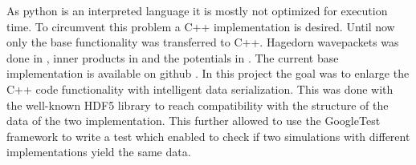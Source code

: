 As python is an interpreted language it is mostly not optimized for execution time. To circumvent this problem a C++ implementation is desired. Until now only the base functionality was transferred to C++. Hagedorn wavepackets was done in \cite{bt_michajab}, inner products in \cite{st_benedekv} and the potentials in \cite{bt_lionelm}. The current base implementation is available on github \cite{libwaveblocks}. In this project the goal was to enlarge the C++ code functionality with intelligent data serialization. This was done with the well-known HDF5 library to reach compatibility with the structure of the data of the two implementation. This further allowed to use the GoogleTest framework to write a test which enabled to check if two simulations with different implementations yield the same data.


